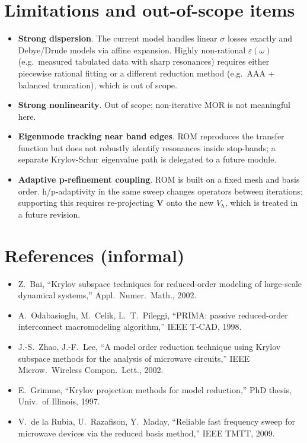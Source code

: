 \documentclass[11pt,a4paper]{article}
\begin{document}
\section{Limitations and out-of-scope items}

\begin{itemize}
\item \textbf{Strong dispersion}. The current model handles linear $\sigma$
      losses exactly and Debye/Drude models via affine expansion. Highly
      non-rational $\varepsilon(\omega)$ (e.g.\ measured tabulated data
      with sharp resonances) requires either piecewise rational fitting or
      a different reduction method (e.g.\ AAA + balanced truncation),
      which is out of scope.
\item \textbf{Strong nonlinearity}. Out of scope; non-iterative MOR is not
      meaningful here.
\item \textbf{Eigenmode tracking near band edges}. ROM reproduces the
      transfer function but does not robustly identify resonances inside
      stop-bands; a separate Krylov-Schur eigenvalue path is delegated to
      a future module.
\item \textbf{Adaptive p-refinement coupling}. ROM is built on a fixed
      mesh and basis order. h/p-adaptivity in the same sweep changes
      operators between iterations; supporting this requires re-projecting
      $\bm V$ onto the new $V_h$, which is treated in a future revision.
\end{itemize}

\section{References (informal)}

\begin{itemize}
\item Z.\ Bai, ``Krylov subspace techniques for reduced-order modeling of large-scale dynamical systems,'' Appl.\ Numer.\ Math., 2002.
\item A.\ Odabasioglu, M.\ Celik, L.~T.\ Pileggi, ``PRIMA: passive reduced-order interconnect macromodeling algorithm,'' IEEE T-CAD, 1998.
\item J.-S.\ Zhao, J.-F.\ Lee, ``A model order reduction technique using Krylov subspace methods for the analysis of microwave circuits,'' IEEE Microw.\ Wireless Compon.\ Lett., 2002.
\item E.\ Grimme, ``Krylov projection methods for model reduction,'' PhD thesis, Univ.\ of Illinois, 1997.
\item V.\ de la Rubia, U.\ Razafison, Y.\ Maday, ``Reliable fast frequency sweep for microwave devices via the reduced basis method,'' IEEE TMTT, 2009.
\end{itemize}
\end{document}
